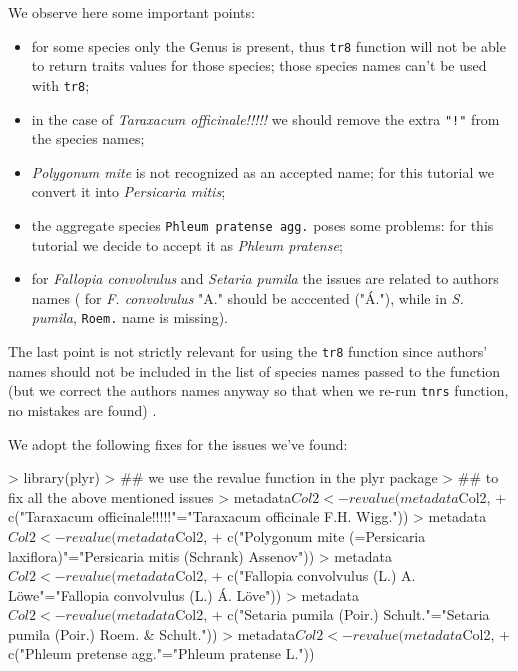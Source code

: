 \documentclass{article}
\begin{document}
\normalsize
 We observe here some important points:
 
 
 \begin{itemize}
 \item for some species only the Genus is present, thus \texttt{tr8} function will not be able to return traits values for
   those species; those species names can't be used with \texttt{tr8};
 \item in the case of \textit{Taraxacum officinale!!!!!} we should remove the extra \texttt{"!"} from the species names;
 \item \textit{Polygonum mite} is not recognized as an accepted name; for this tutorial we convert it into \textit{Persicaria mitis};
 \item the aggregate species \texttt{Phleum pratense agg.} poses some problems: for this tutorial we decide to accept it as \textit{Phleum pratense};
 \item for \textit{Fallopia convolvulus} and \textit{Setaria pumila} the issues are related to authors names ( for \textit{F. convolvulus} "A." should be acccented ("Á."), while in \textit{S. pumila}, \texttt{Roem.} name is missing).
\end{itemize}

  The last point is not strictly relevant for using the \texttt{tr8} function
  since authors' names should not be included in the list of species
  names passed to the function (but we correct the authors names anyway so that when we re-run \texttt{tnrs} function, no mistakes are found) . 

  We adopt the following fixes for the issues we've found:
\small
\begin{Schunk}
\begin{Sinput}
> library(plyr)
> ## we use the revalue function in the plyr package
> ## to fix all the above mentioned issues
> metadata$Col2<-revalue(metadata$Col2, 
+      c("Taraxacum officinale!!!!!"="Taraxacum officinale F.H. Wigg."))
> metadata$Col2<-revalue(metadata$Col2,
+      c("Polygonum mite (=Persicaria laxiflora)"="Persicaria mitis (Schrank) Assenov"))
> metadata$Col2<-revalue(metadata$Col2,
+      c("Fallopia convolvulus (L.) A. Löwe"="Fallopia convolvulus (L.) Á. Löve"))
> metadata$Col2<-revalue(metadata$Col2,
+      c("Setaria pumila (Poir.) Schult."="Setaria pumila (Poir.) Roem. & Schult."))
> metadata$Col2<-revalue(metadata$Col2,
+      c("Phleum pretense agg."="Phleum pratense L."))
\end{Sinput}
\end{Schunk}
\end{document}
